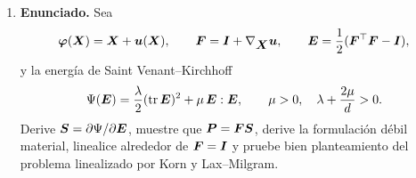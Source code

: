 \documentclass[11pt]{article}
\newcommand{\norm}[1]{\left\lVert #1\right\rVert}
\def\vec   #1{\mbox{\boldmath $#1$}{}}
\def\ten   #1{\mbox{\boldmath $#1$}{}}
\def\dX{\mbox{\(\,\mathrm{d}X\)}}
\DeclareMathOperator{\tr}{tr}
\begin{document}
\begin{enumerate}[label=\textbf{\arabic*.}, leftmargin=*]
\begin{enumerate}[label=(\alph*)]
        \item Si
        \[
            g_{\mathrm{mec}}^{n+1}=m(\vec X)\theta^{n+1}+\widetilde g^{n+1},
        \]
        y se mueve el término implícito al lado izquierdo, aparece
        \[
        \begin{aligned}
            a_m(\theta,q)
            &=
            \frac{\rho_0c_v}{\Delta t}\int_{\Omega_0}\theta q\dX
            +\int_{\Omega_0}\ten\kappa\nabla_{\vec X}\theta\cdot\nabla_{\vec X}q\dX
            -\int_{\Omega_0}m\theta q\dX.
        \end{aligned}
        \]
        Una condición suficiente para conservar coercividad es
        \[
            \frac{\rho_0c_v}{\Delta t}-m(\vec X)\ge m_0>0
            \qquad\text{c.t.p. en }\Omega_0.
        \]
        Entonces
        \[
            a_m(\theta,\theta)
            \ge m_0\norm{\theta}_{L^2}^2+\kappa_0\norm{\nabla\theta}_{L^2}^2
            \ge c\norm{\theta}_{H^1}^2.
        \]
    \end{enumerate}

    \item \textbf{Enunciado.} Sea
    \[
        \vec\varphi(\vec X)=\vec X+\vec u(\vec X),
        \qquad
        \ten F=\ten I+\nabla_{\vec X}\vec u,
        \qquad
        \ten E=\frac12(\ten F^\top\ten F-\ten I),
    \]
    y la energía de Saint Venant--Kirchhoff
    \[
        \Psi(\ten E)=\frac{\lambda}{2}(\tr\ten E)^2+\mu\,\ten E:\ten E,
        \qquad
        \mu>0,\quad \lambda+\frac{2\mu}{d}>0.
    \]
    Derive $\ten S=\partial\Psi/\partial\ten E$, muestre que $\ten P=\ten F\ten S$, derive la formulación débil material, linealice alrededor de $\ten F=\ten I$ y pruebe bien planteamiento del problema linealizado por Korn y Lax--Milgram.


\end{enumerate}
\end{document}
